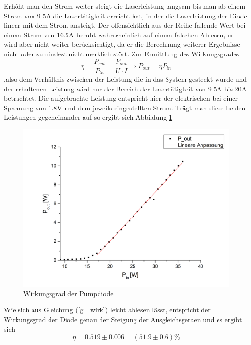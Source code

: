 Erhöht man den Strom weiter steigt die Laserleistung langsam bis man ab einem Strom von 9.5A die Lasertätigkeit erreicht hat, in der die Laserleistung der Diode linear mit dem Strom ansteigt. \newline
Der offensichtlich aus der Reihe fallende Wert bei einem Strom von 16.5A beruht wahrscheinlich auf einem falschen Ablesen, er wird aber nicht weiter berücksichtigt, da er die Berechnung weiterer Ergebnisse nicht oder zumindest nicht merklich stört. \newline
Zur Ermittlung des Wirkungsgrades 
\begin{equation}
\eta=\frac{P_{out}}{P_{in}}=\frac{P_{out}}{U\cdot I}\Longrightarrow P_{out}=\eta P_{in}
\label{gl_wirk}
\end{equation}
,also dem Verhältnis zwischen der Leistung die in das System gesteckt wurde und der erhaltenen Leistung wird nur der Bereich der Lasertätigkeit von 9.5A bis 20A betrachtet. Die aufgebrachte Leistung entspricht hier der elektrischen bei einer Spannung von 1.8V und dem jeweils eingestellten Strom. Trägt man diese beiden Leistungen gegeneinander auf so ergibt sich \newline Abbildung \ref{wirkung}
\begin{figure}[H]
	\begin{center}
		\includegraphics[scale=.5]{Bilder/Wirkungsgrad.png}
		\caption{Wirkungsgrad der Pumpdiode}
		\label{wirkung}
	\end{center}
\end{figure}
Wie sich aus Gleichung (\ref{gl_wirk}) leicht ablesen lässt, entspricht der Wirkungsgrad der Diode genau der Steigung der Ausgleichsgeraen und es ergibt sich
\begin{equation}
\eta=0.519\pm0.006=(51.9\pm0.6)\%
\end{equation}
